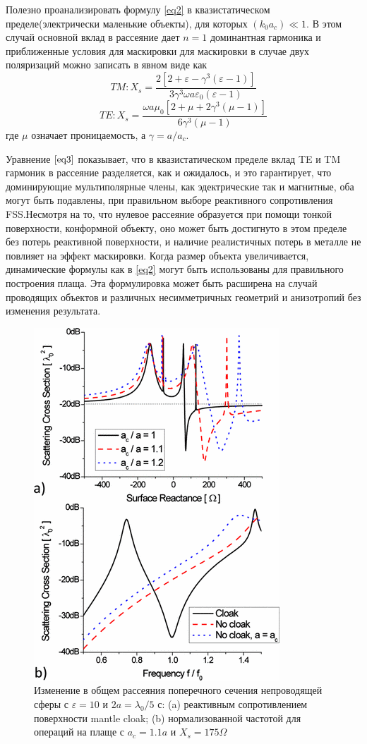 \documentclass[12pt,a4paper]{article}
\begin{document}
Полезно проанализировать формулу \ref{eq2} в квазистатическом пределе(электрически маленькие 
объекты), для которых $(k_0a_c) \ll 1$. В этом случай основной вклад в рассеяние дает
$n=1$ доминантная гармоника и приближенные условия для маскировки для маскировки в 
случае двух поляризаций можно записать в явном виде как
\begin{equation*}
TM:X_s = 
\frac{2[2+\varepsilon-\gamma^3(\varepsilon-1)]}{3\gamma^3\omega a\varepsilon_0(\varepsilon-1)
}
\end{equation*}
\begin{equation}\label{eq3}
TE:X_s = \frac{\omega a\mu_0[2+\mu+2\gamma^3(\mu-1)]}{6\gamma^3(\mu-1)}
\end{equation}
где $\mu$ означает проницаемость, а $\gamma=a/a_c$.

Уравнение $\ref{eq3}$ показывает, что в квазистатическом пределе вклад TE и TM гармоник в 
рассеяние разделяется, как и ожидалось, и это гарантирует, что доминирующие мультиполярные
члены, как эдектрические так и магнитные, оба могут быть подавлены, при правильном выборе
реактивного сопротивления FSS.Несмотря на то, что нулевое рассеяние образуется при помощи 
тонкой поверхности, конформной объекту, оно может быть достигнуто в этом пределе без потерь 
реактивной поверхности, и наличие реалистичных потерь в металле не повлияет на эффект 
маскировки. Когда размер объекта увеличивается, динамические формулы как в \ref{eq2} могут
быть использованы для правильного построения плаща. Эта формулировка может быть расширена на
случай проводящих объектов и различных несимметричных геометрий и анизотропий без изменения
результата.

\begin{figure}[t]
  \centering
  \includegraphics[height=0.3\paperheight, width=0.4\paperwidth]{2.png}
  \caption{Изменение в общем рассеяния поперечного сечения непроводящей сферы с $\varepsilon
  =10$ и $2a=\lambda_0/5$ с: (a) реактивным сопротивлением поверхности mantle cloak; (b)
  нормализованной частотой для операций на плаще с $a_c=1.1a$ и $X_s=175\Omega$}
  \label{fig:2}
\end{figure}
\end{document}
